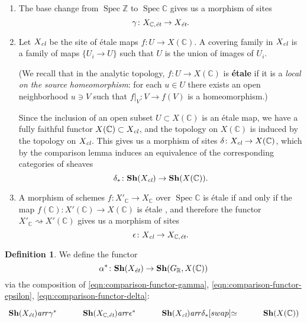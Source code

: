 \documentclass[leqno,12pt]{article}
\theoremstyle{plain}
\theoremstyle{definition}
\newtheorem{definition}[theorem]{\indent\sc Definition}
\DeclareMathOperator{\Spec}{Spec}
\newcommand{\CC}{\mathbb{C}}
\newcommand{\RR}{\mathbb{R}}
\newcommand{\ZZ}{\mathbb{Z}}
\newcommand{\ar}{\text{\it ar}}
\newcommand{\et}{\text{\it \'{e}t}}
\begin{document}
\begin{enumerate}
\item The base change from $\Spec \ZZ$ to $\Spec \CC$ gives us a morphism of
  sites
  \begin{equation}
    \label{eqn:comparison-functor-gamma}
    \gamma\colon X_{\CC,\text{\it \'{e}t}} \to X_\et.
  \end{equation}

\item Let $X_\text{\it cl}$ be the site of \'{e}tale maps
  $f\colon U\to X (\CC)$. A covering family in $X_\text{\it cl}$ is a family of
  maps $\{ U_i \to U \}$ such that $U$ is the union of images of $U_i$.

  (We recall that in the analytic topology, $f\colon U\to X (\CC)$ is \textbf{\'{e}tale}
  if it is a \emph{local on the source homeomorphism}: for each $u \in U$ there
  exists an open neighborhood $u \ni V$ such that
  $\left.f\right|_V\colon V\to f(V)$ is a homeomorphism.)

  Since the inclusion of an open subset $U \subset X (\CC)$ is an \'{e}tale map,
  we have a fully faithful functor $X (\CC) \subset X_\text{\it cl}$, and the
  topology on $X (\CC)$ is induced by the topology on $X_\text{\it cl}$. This
  gives us a morphism of sites $\delta\colon X_\text{\it cl} \to X (\CC)$, which
  by the comparison lemma \cite[Expos\'{e}~III, Th\'{e}or\`{e}me~4.1]{SGA4}
  induces an equivalence of the corresponding categories of sheaves
  \begin{equation}
    \label{eqn:comparison-functor-delta}
    \delta_*\colon \mathbf{Sh} (X_\text{\it cl}) \to \mathbf{Sh} (X (\CC)).
  \end{equation}

\item A morphism of schemes $f\colon X'_\CC \to X_\CC$ over $\Spec \CC$ is
  \'{e}tale if and only if the map $f (\CC)\colon X' (\CC) \to X (\CC)$ is
  \'{e}tale \cite[Expos\'{e}~XII, Proposition~3.1]{SGA1}, and therefore the
  functor $X'_\CC \rightsquigarrow X' (\CC)$ gives us a morphism of sites
  \begin{equation}
    \label{eqn:comparison-functor-epsilon}
    \epsilon\colon X_\text{\it cl} \to X_{\CC,\text{\it \'{e}t}}.
  \end{equation}
\end{enumerate}

\begin{definition}
  We define the functor
  $$\alpha^*\colon \mathbf{Sh} (X_\et) \to \mathbf{Sh} (G_\RR, X (\CC))$$
  via the composition of \eqref{eqn:comparison-functor-gamma},
  \eqref{eqn:comparison-functor-epsilon}, \eqref{eqn:comparison-functor-delta}:
  \[ \begin{tikzcd}
      \mathbf{Sh} (X_\et) \ar{r}{\gamma^*} &
      \mathbf{Sh} (X_{\CC,\text{\it \'{e}t}}) \ar{r}{\epsilon^*} &
      \mathbf{Sh} (X_\text{\it cl}) \ar{r}{\delta_*}[swap]{\simeq} &
      \mathbf{Sh} (X (\CC))
    \end{tikzcd} \]
\end{definition}
\end{document}
